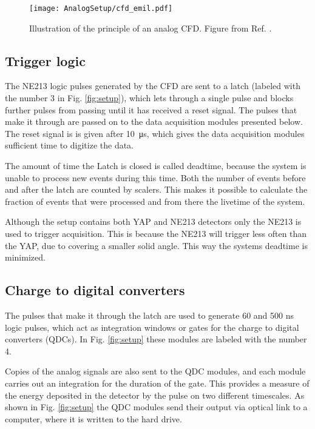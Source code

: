 \documentclass[main.tex]{subfiles}
\begin{document}
\begin{figure}[h]
    \centering
        \texttt{[image: AnalogSetup/cfd\_emil.pdf]}
        \caption[CFD trigger principle]{Illustration of the principle of an analog CFD. Figure from Ref. \cite{rofors}.}
    \label{fig:cfd}
\end{figure}



\subsection{Trigger logic}
The NE213 logic pulses generated by the CFD are sent to a latch (labeled with the number 3 in Fig. \ref{fig:setup}), which lets through a single pulse and blocks further pulses from passing until it has received a reset signal. The pulses that make it through are passed on to the data acquisition modules presented below. The reset signal is is given after \SI{10}{\micro\second}, which gives the data acquisition modules sufficient time to digitize the data.

The amount of time the Latch is closed is called deadtime, because the system is unable to process new events during this time. Both the number of events before and after the latch are counted by scalers. This makes it possible to calculate the fraction of events that were processed and from there the livetime of the system.

Although the setup contains both YAP and NE213 detectors only the NE213 is used to trigger acquisition. This is because the NE213 will trigger less often than the YAP, due to covering a smaller solid angle. This way the systems deadtime is minimized.

\subsection{Charge to digital converters}
The pulses that make it through the latch are used to generate 60 and 500 ns logic pulses, which act as integration windows or gates for the charge to digital converters (QDCs). In Fig. \ref{fig:setup} these modules are labeled with the number 4.

Copies of the analog signals are also sent to the QDC modules, and each module carries out an integration for the duration of the gate. This provides a measure of the energy deposited in the detector by the pulse on two different timescales. As shown in Fig. \ref{fig:setup} the QDC modules send their output via optical link to a computer, where it is written to the hard drive.
\end{document}
